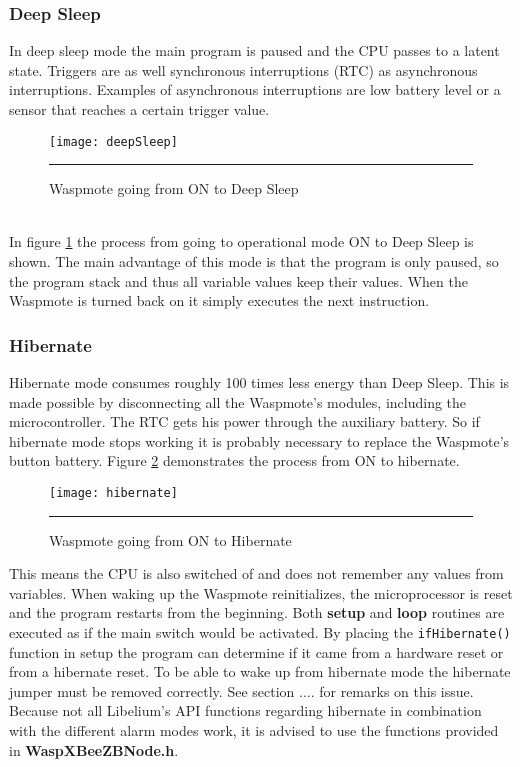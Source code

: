 \subsubsection{Deep Sleep}
In deep sleep mode the main program is paused and the CPU passes to a latent state. Triggers are as well synchronous interruptions (RTC) as asynchronous interruptions. Examples of asynchronous interruptions are low battery level or a sensor that reaches a certain trigger value.\bigskip
\begin{figure}[ht]
\centering
\texttt{[image: deepSleep]}
\rule{30em}{0.5pt}
\caption{Waspmote going from ON to Deep Sleep}
\label{fig:deepSleep}
\end{figure}\bigskip
\\In figure \ref{fig:deepSleep} the process from going to operational mode ON to Deep Sleep is shown. The main advantage of this mode is that the program is only paused, so the program stack and thus all variable values keep their values. When the Waspmote is turned back on it simply executes the next instruction.
\subsubsection{Hibernate}
Hibernate mode consumes roughly 100 times less energy than Deep Sleep. This is made possible by disconnecting all the Waspmote's modules, including the microcontroller. The RTC gets his power through the auxiliary battery. So if hibernate mode stops working it is probably necessary to replace the Waspmote's button battery. Figure \ref{fig:hibernate} demonstrates the process from ON to hibernate. \\
\begin{figure}[ht]
\centering
\texttt{[image: hibernate]}
\rule{30em}{0.5pt}
\caption{Waspmote going from ON to Hibernate}
\label{fig:hibernate}
\end{figure}
This means the CPU is also switched of and does not remember any values from variables. When waking up the Waspmote reinitializes, the microprocessor is reset and the program restarts from the beginning. Both \textbf{setup} and \textbf{loop} routines are executed as if the main switch would be activated. By placing the \verb+ifHibernate()+ function in setup the program can determine if it came from a hardware reset or from a hibernate reset. To be able to wake up from hibernate mode the hibernate jumper must be removed correctly. See section .... for remarks on this issue. \\Because not all Libelium's API functions regarding hibernate in combination with the different alarm modes work, it is advised to use the functions provided in \textbf{WaspXBeeZBNode.h}. 

